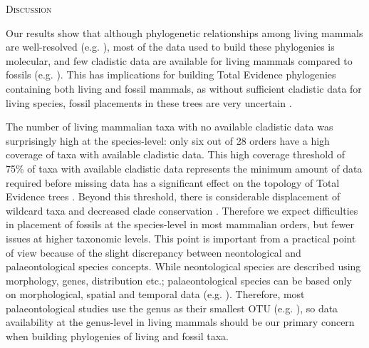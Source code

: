 \documentclass[12pt,letterpaper]{article}
\renewcommand{\section}[1]{%
\bigskip
\begin{center}
\begin{Large}
\normalfont\scshape #1
\medskip
\end{Large}
\end{center}}
\begin{document}
%
%

\section{Discussion}
Our results show that although phylogenetic relationships among living mammals are well-resolved (e.g. \cite{BinindaEmonds,meredithimpacts2011}), most of the data used to build these phylogenies is molecular, and few cladistic data are available for living mammals compared to fossils (e.g. \cite{O'Leary08022013,ni2013oldest}).
This has implications for building Total Evidence phylogenies containing both living and fossil mammals, as without sufficient cladistic data for living species, fossil placements in these trees are very uncertain \cite{GuillermeCooper}.

The number of living mammalian taxa with no available cladistic data was surprisingly high at the species-level: only six out of 28 orders have a high coverage of taxa with available cladistic data.
This high coverage threshold of 75\% of taxa with available cladistic data represents the minimum amount of data required before missing data has a significant effect on the topology of Total Evidence trees \cite{GuillermeCooper}.
Beyond this threshold, there is considerable displacement of wildcard taxa and decreased clade conservation \cite{GuillermeCooper}.
Therefore we expect difficulties in placement of fossils at the species-level in most mammalian orders, but fewer issues at higher taxonomic levels.
This point is important from a practical point of view because of the slight discrepancy between neontological and palaeontological species concepts.
While neontological species are described using morphology, genes, distribution etc.; palaeontological species can be based only on morphological, spatial and temporal data (e.g. \cite{ni2013oldest}).
Therefore, most palaeontological studies use the genus as their smallest OTU (e.g. \cite{ni2013oldest,O'Leary08022013}), so data availability at the genus-level in living mammals should be our primary concern when building phylogenies of living and fossil taxa.
\end{document}
